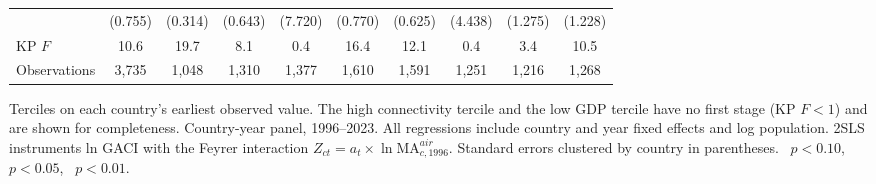 \begin{table}[H]
\begin{minipage}{\linewidth}
{\begin{tabular}{lccccccccc}
 & (0.755) & (0.314) & (0.643) & (7.720) & (0.770) & (0.625) & (4.438) & (1.275) & (1.228) \\
KP $F$ & 10.6 & 19.7 & 8.1 & 0.4 & 16.4 & 12.1 & 0.4 & 3.4 & 10.5 \\
Observations & 3{,}735 & 1{,}048 & 1{,}310 & 1{,}377 & 1{,}610 & 1{,}591 & 1{,}251 & 1{,}216 & 1{,}268 \\
\bottomrule
\end{tabular}}
\par\vspace{3pt}\begin{flushleft}\footnotesize Terciles on each country's earliest observed value. The high connectivity tercile and the low GDP tercile have no first stage (KP $F<1$) and are shown for completeness. Country-year panel, 1996--2023. All regressions include country and year fixed effects and log population. 2SLS instruments ln GACI with the Feyrer interaction $Z_{ct}=a_t\times\ln \mathrm{MA}^{air}_{c,1996}$. Standard errors clustered by country in parentheses. \sym{*}~$p<0.10$, \sym{**}~$p<0.05$, \sym{***}~$p<0.01$.\end{flushleft}
\end{minipage}
\end{table}
